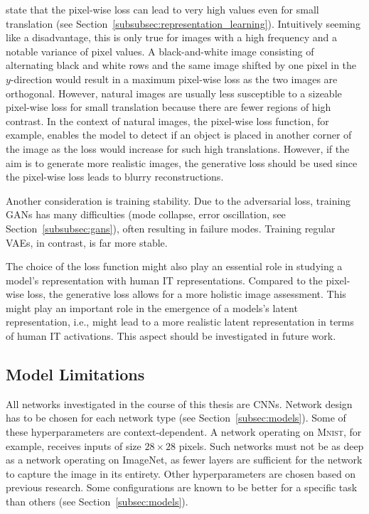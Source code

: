 \citet{larsen2015autoencoding} state that the pixel-wise loss can lead to very high values even for small translation (see Section~\ref{subsubsec:representation_learning}).
Intuitively seeming like a disadvantage, this is only true for images with a high frequency and a notable variance of pixel values.
A black-and-white image consisting of alternating black and white rows and the same image shifted by one pixel in the $y$-direction would result in a maximum pixel-wise loss as the two images are orthogonal.
However, natural images are usually less susceptible to a sizeable pixel-wise loss for small translation because there are fewer regions of high contrast.
In the context of natural images, the pixel-wise loss function, for example, enables the model to detect if an object is placed in another corner of the image as the loss would increase for such high translations.
However, if the aim is to generate more realistic images, the generative loss should be used since the pixel-wise loss leads to blurry reconstructions.

Another consideration is training stability.
Due to the adversarial loss, training \acp{GAN} has many difficulties (mode collapse, error oscillation, see Section~\ref{subsubsec:gans}), often resulting in failure modes.
Training regular \acp{VAE}, in contrast, is far more stable.

The choice of the loss function might also play an essential role in studying a model's representation with human \ac{IT} representations.
Compared to the pixel-wise loss, the generative loss allows for a more holistic image assessment.
This might play an important role in the emergence of a models's latent representation, i.e., might lead to a more realistic latent representation in terms of human IT activations.
This aspect should be investigated in future work.

\subsection{Model Limitations}\label{subsec:model-limitations}
All networks investigated in the course of this thesis are \acp{CNN}.
Network design has to be chosen for each network type (see Section~\ref{subsec:models}).
Some of these hyperparameters are context-dependent.
A network operating on \textsc{Mnist}, for example, receives inputs of size $28\times 28$ pixels.
Such networks must not be as deep as a network operating on ImageNet, as fewer layers are sufficient for the network to capture the image in its entirety.
Other hyperparameters are chosen based on previous research.
Some configurations are known to be better for a specific task than others (see Section~\ref{subsec:models}).

